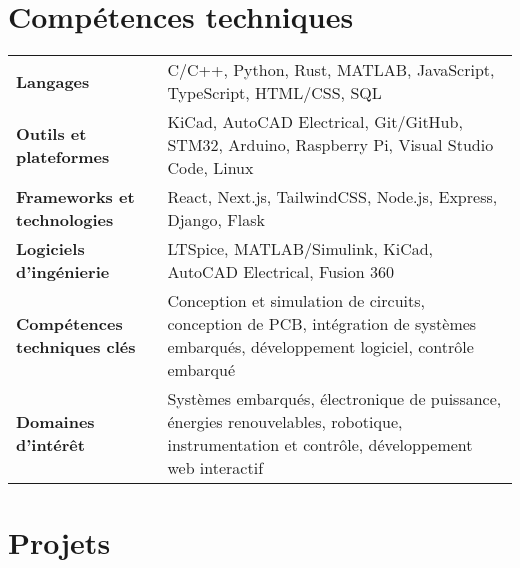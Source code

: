 \documentclass[a4paper,12pt]{article}
\begin{document}

\section{Compétences techniques}

\begin{tabularx}{\linewidth}{@{}l X@{}}

\textbf{Langages} & 
C/C++, Python, Rust, MATLAB, JavaScript, TypeScript, HTML/CSS, SQL \\[1.5em]

\textbf{Outils et plateformes} & 
KiCad, AutoCAD Electrical, Git/GitHub, STM32, Arduino, Raspberry Pi, Visual Studio Code, Linux \\[1.5em]

\textbf{Frameworks et technologies} & 
React, Next.js, TailwindCSS, Node.js, Express, Django, Flask \\[1.5em]

\textbf{Logiciels d’ingénierie} & 
LTSpice, MATLAB/Simulink, KiCad, AutoCAD Electrical, Fusion 360 \\[1.5em]

\textbf{Compétences techniques clés} & 
Conception et simulation de circuits, conception de PCB, intégration de systèmes embarqués, développement logiciel, contrôle embarqué \\[1.5em]

\vspace{1.2em}


\textbf{Domaines d’intérêt} & 
Systèmes embarqués, électronique de puissance, énergies renouvelables, robotique, instrumentation et contrôle, développement web interactif \\[1.5em]

\end{tabularx}

\section{Projets}
\end{document}
